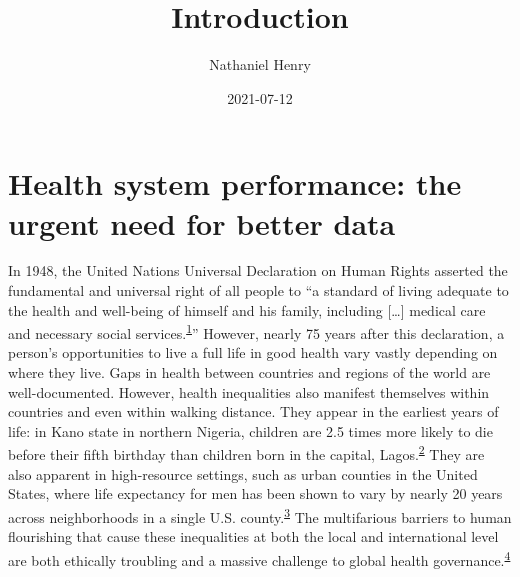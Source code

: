 \documentclass[
]{article}
\title{Introduction}
\author{Nathaniel Henry\textsuperscript{}}
\date{2021-07-12}
\begin{document}
\maketitle

\hypertarget{health-system-performance-the-urgent-need-for-better-data}{%
\section{Health system performance: the urgent need for better data}\label{health-system-performance-the-urgent-need-for-better-data}}

In 1948, the United Nations Universal Declaration on Human Rights asserted the fundamental and universal right of all people to ``a standard of living adequate to the health and well-being of himself and his family, including {[}\ldots{]} medical care and necessary social services.\textsuperscript{\protect\hyperlink{ref-UNGeneralAssembly1948}{1}}'' However, nearly 75 years after this declaration, a person's opportunities to live a full life in good health vary vastly depending on where they live. Gaps in health between countries and regions of the world are well-documented. However, health inequalities also manifest themselves within countries and even within walking distance. They appear in the earliest years of life: in Kano state in northern Nigeria, children are 2.5 times more likely to die before their fifth birthday than children born in the capital, Lagos.\textsuperscript{\protect\hyperlink{ref-Burstein2019}{2}} They are also apparent in high-resource settings, such as urban counties in the United States, where life expectancy for men has been shown to vary by nearly 20 years across neighborhoods in a single U.S. county.\textsuperscript{\protect\hyperlink{ref-Dwyer-Lindgren2017}{3}} The multifarious barriers to human flourishing that cause these inequalities at both the local and international level are both ethically troubling and a massive challenge to global health governance.\textsuperscript{\protect\hyperlink{ref-Ruger2006}{4}}
\end{document}
